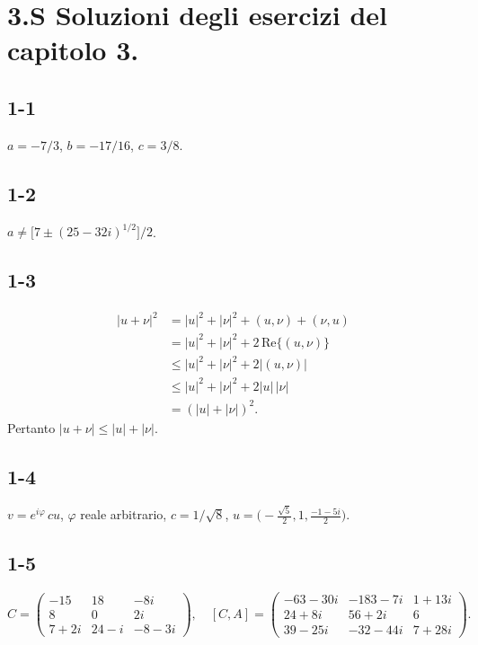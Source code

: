 \documentclass[11pt, a4paper]{book}
\numberwithin{equation}{section}
\begin{document}
\section*{3.S \quad Soluzioni degli esercizi del capitolo 3.}

\subsection*{1-1} $a = -7/3$, $b = -17/16$, $c = 3/8$.

\subsection*{1-2} $a \neq \bigl[7 \pm (25-32i)^{1/2}\bigr]/2$.

\subsection*{1-3}
\begin{align*}
|u+\nu|^2 &= |u|^2 + |\nu|^2 + (u,\nu) + (\nu,u) \\
  &= |u|^2 + |\nu|^2 + 2\,\mathrm{Re}\{(u,\nu)\} \\
  &\leq |u|^2 + |\nu|^2 + 2|(u,\nu)| \\
  &\leq |u|^2 + |\nu|^2 + 2|u|\,|\nu| \\
  &= (|u|+|\nu|)^2.
\end{align*}
Pertanto $|u+\nu| \leq |u| + |\nu|$.

\subsection*{1-4} $v = e^{i\varphi}\,cu$, $\varphi$ reale arbitrario,
$c = 1/\sqrt{8}$, $u = \bigl(-\frac{\sqrt{5}}{2}, 1,
\frac{-1-5i}{2}\bigr)$.

\subsection*{1-5}
\[
C =
\begin{pmatrix}
-15    & 18    & -8i   \\
8      & 0     & 2i    \\
7+2i   & 24-i  & -8-3i
\end{pmatrix},
\quad
[C,A] =
\begin{pmatrix}
-63-30i & -183-7i & 1+13i \\
24+8i   & 56+2i   & 6     \\
39-25i  & -32-44i & 7+28i
\end{pmatrix}.
\]
\end{document}

